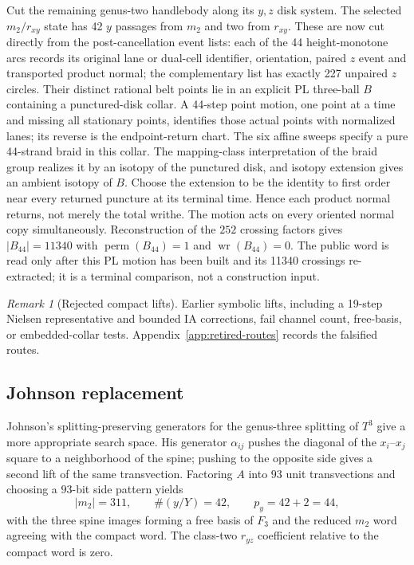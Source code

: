 \documentclass[11pt]{amsart}
\theoremstyle{definition}
\theoremstyle{remark}
\newtheorem{remark}[theorem]{Remark}
\begin{document}
Cut the remaining genus-two handlebody along its $y,z$ disk system.  The
selected $m_2/r_{xy}$ state has 42 $y$ passages from $m_2$ and two from
$r_{xy}$.  These are now cut directly from the post-cancellation event lists:
each of the 44 height-monotone arcs records its original lane or dual-cell
identifier, orientation, paired $z$ event and transported product normal;
the complementary list has exactly 227 unpaired $z$ circles.  Their distinct
rational belt points lie in an explicit PL three-ball $B$ containing a
punctured-disk collar.  A 44-step point motion, one point at a time and missing
all stationary points, identifies those actual points with normalized lanes;
its reverse is the endpoint-return chart.
The six affine sweeps specify a pure 44-strand braid in this collar.  The
mapping-class interpretation of the braid group realizes it by an isotopy of
the punctured disk, and isotopy extension gives an ambient isotopy of $B$.
Choose the extension to be the identity to first order near every returned
puncture at its terminal time.  Hence each product normal returns, not merely
the total writhe.  The motion acts on every oriented normal copy
simultaneously.  Reconstruction of the $252$ crossing factors gives
$|B_{44}|=11340$ with $\operatorname{perm}(B_{44})=1$ and
$\operatorname{wr}(B_{44})=0$.  The public word is read only after this PL
motion has been built and its 11340 crossings re-extracted; it is a terminal
comparison, not a construction input.

\begin{remark}[Rejected compact lifts]
Earlier symbolic lifts, including a 19-step Nielsen representative and
bounded IA corrections, fail channel count, free-basis, or embedded-collar
tests.  Appendix~\ref{app:retired-routes} records the falsified routes.
\end{remark}

\subsection{Johnson replacement}

Johnson's splitting-preserving generators for the genus-three splitting of
$T^3$ \cite{Johnson2011} give a more appropriate search space.  His generator
$\alpha_{ij}$ pushes the diagonal of the $x_i$--$x_j$ square to a
neighborhood of the spine; pushing to the opposite side gives a second lift of
the same transvection.  Factoring $A$ into $93$ unit transvections and choosing
a $93$-bit side pattern yields
\[
|m_2|=311,\qquad \#(y/Y)=42,\qquad p_y=42+2=44,
\]
with the three spine images forming a free basis of $F_3$ and the reduced
$m_2$ word agreeing with the compact word.  The class-two $r_{yz}$ coefficient
relative to the compact word is zero.
\end{document}
